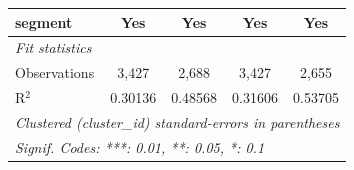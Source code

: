 \begin{tabular}{lcccc}
   segment                                       & Yes            & Yes             & Yes            & Yes\\  
   \midrule
   \emph{Fit statistics}\\
   Observations                                  & 3,427          & 2,688           & 3,427          & 2,655\\  
   R$^2$                                         & 0.30136        & 0.48568         & 0.31606        & 0.53705\\  
   \midrule \midrule
   \multicolumn{5}{l}{\emph{Clustered (cluster\_id) standard-errors in parentheses}}\\
   \multicolumn{5}{l}{\emph{Signif. Codes: ***: 0.01, **: 0.05, *: 0.1}}\\
\end{tabular}
\par\endgroup


